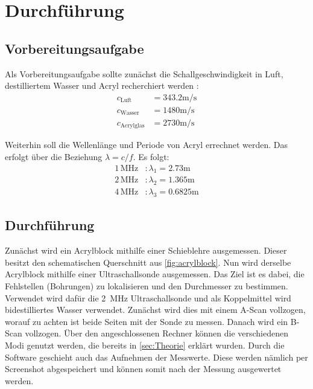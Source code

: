 \section{Durchführung}
\label{sec:Durchführung}

\subsection{Vorbereitungsaufgabe}

Als Vorbereitungsaufgabe sollte zunächst die Schallgeschwindigkeit in Luft, destilliertem Wasser und Acryl recherchiert werden \cite{schallgeschw}:
\begin{align*}
    c_\text{Luft} &= 343.2 \unit{\meter} / \unit{\second} \\
    c_\text{Wasser} &= 1480 \unit{\meter} / \unit{\second} \\
    c_\text{Acrylglas} &= 2730 \unit{\meter} / \unit{\second}
\end{align*} 

Weiterhin soll die Wellenlänge und Periode von Acryl errechnet werden. Das erfolgt über die Beziehung $\lambda = c / f$.
Es folgt:
\begin{align*}
    1 \, \unit{\mega\hertz}&: \lambda_1 =  2.73 \unit\meter\\
    2 \, \unit{\mega\hertz}&: \lambda_2 =  1.365\unit\meter\\
    4 \, \unit{\mega\hertz}&: \lambda_3 =  0.6825 \unit\meter
\end{align*}

\subsection{Durchführung}

Zunächst wird ein Acrylblock mithilfe einer Schieblehre ausgemessen.
Dieser besitzt den schematischen Querschnitt aus \autoref{fig:acrylblock}.
Nun wird derselbe Acrylblock mithilfe einer Ultraschallsonde ausgemessen.
Das Ziel ist es dabei, die Fehlstellen (Bohrungen) zu lokalisieren und den Durchmesser zu bestimmen. 
Verwendet wird dafür die \qty{2}{\MHz} Ultraschallsonde und als Koppelmittel wird bidestilliertes Wasser verwendet.
Zunächst wird dies mit einem A-Scan vollzogen, worauf zu achten ist beide Seiten mit der Sonde zu messen.
Danach wird ein B-Scan vollzogen.
Über den angeschlossenen Rechner können die verschiedenen Modi genutzt werden, die bereits in \autoref{sec:Theorie} erklärt wurden.
Durch die Software geschieht auch das Aufnehmen der Messwerte.
Diese werden nämlich per Screenshot abgespeichert und können somit nach der Messung ausgewertet werden.

